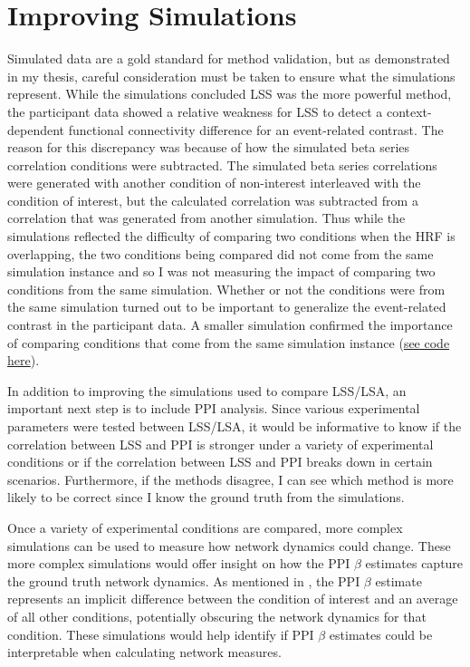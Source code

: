 \documentclass[phd,figures,tables,ackpage,abstractpage,publicabstractpage]{uithesis}
\begin{document}
\section{Improving Simulations}

Simulated data are a gold standard for method validation, but as demonstrated in my
thesis, careful consideration must be taken to ensure what the simulations represent.
While the simulations concluded LSS was the more powerful method, the 
participant data showed a relative weakness for LSS to detect a
context-dependent functional connectivity difference for an
event-related contrast.
The reason for this discrepancy was because of how the simulated
beta series correlation conditions were subtracted.
The simulated beta series correlations were generated with another condition
of non-interest interleaved with the condition of interest, but the calculated
correlation was subtracted from a correlation that was
generated from another simulation.
Thus while the simulations reflected the difficulty of comparing two conditions
when the HRF is overlapping, the two conditions being compared did not come
from the same simulation instance and so I was not measuring the impact
of comparing two conditions from the same simulation.
Whether or not the conditions were from the same simulation
turned out to be important to generalize the event-related contrast
in the participant data.
A smaller simulation confirmed the importance of comparing conditions
that come from the same simulation instance
(\href{https://github.com/jdkent/BetaSeriesRealDataAnalysis/blob/49e95ff36721abc66fde67202a34866979af0954/nibsAnalysis/investigate_induced_correlations.ipynb}{see code here}).

In addition to improving the simulations used to compare LSS/LSA,
an important next step is to include PPI analysis.
Since various experimental parameters were tested between LSS/LSA,
it would be informative to know if the correlation between LSS and PPI
is stronger under a variety of experimental conditions or if
the correlation between LSS and PPI breaks down in certain scenarios.
Furthermore, if the methods disagree, I can see which method
is more likely to be correct since I know the ground truth from
the simulations.

Once a variety of experimental conditions are compared, more complex
simulations can be used to measure how network dynamics could change.
These more complex simulations would offer insight on how the PPI
$\beta$ estimates capture the ground truth network dynamics.
As mentioned in , the PPI $\beta$ estimate
represents an implicit difference between the condition of interest
and an average of all other conditions, potentially obscuring the network
dynamics for that condition.
These simulations would help identify if PPI $\beta$ estimates could be
interpretable when calculating network measures.
\end{document}
